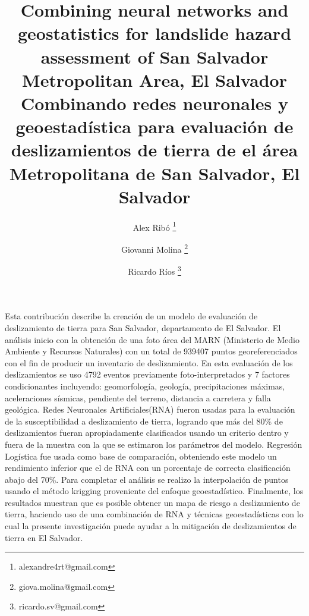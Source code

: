 \documentclass[11pt,twoside]{rmta2010esp}%
\begin{document}
\title{Combining neural networks and geostatistics for landslide hazard assessment of San Salvador Metropolitan Area, El Salvador 
\newline
\newline
Combinando redes neuronales y geoestad\'{i}stica para evaluaci\'{o}n de deslizamientos de tierra de el \'{a}rea Metropolitana de San Salvador, El Salvador}

\author[1]{Alex Rib\'{o} \thanks{alexandre4rt@gmail.com }}
\author[2]{Giovanni Molina \thanks{giova.molina@gmail.com}}
\author[3]{Ricardo Ríos \thanks{ricardo.sv@gmail.com}}





\maketitle


\begin{resumen}
Esta contribución describe la creaci\'{o}n de un modelo de evaluaci\'{o}n de deslizamiento de tierra para San Salvador, departamento de El Salvador. El análisis inicio con la obtención de una foto área del MARN (Ministerio de Medio Ambiente y Recursos Naturales) con un total de 939407 puntos georeferenciados con el fin de producir un inventario de deslizamiento. En esta evaluación de los deslizamientos se uso 4792 eventos previamente foto-interpretados y 7 factores condicionantes incluyendo: geomorfología, geología, precipitaciones máximas, aceleraciones sísmicas, pendiente del terreno, distancia a carretera y falla geológica. Redes Neuronales Artificiales(RNA) fueron usadas para la evaluación de la susceptibilidad a deslizamiento de tierra, logrando que más del 80\% de deslizamientos fueran apropiadamente clasificados usando un criterio dentro y fuera de la muestra con la que se estimaron los parámetros del modelo. Regresión Logística fue usada como base de comparación, obteniendo este modelo un rendimiento inferior que el de RNA con un porcentaje de correcta clasificación abajo del 70\%. Para completar el análisis se realizo la interpolación de puntos usando el método krigging proveniente del enfoque geoestadístico. Finalmente, los resultados muestran que es posible obtener un mapa de riesgo a deslizamiento de tierra, haciendo uso de una combinación de RNA y técnicas geoestadísticas con lo cual la presente investigación puede ayudar a la mitigación de deslizamientos de tierra en El Salvador.
\end{resumen}
\end{document}
